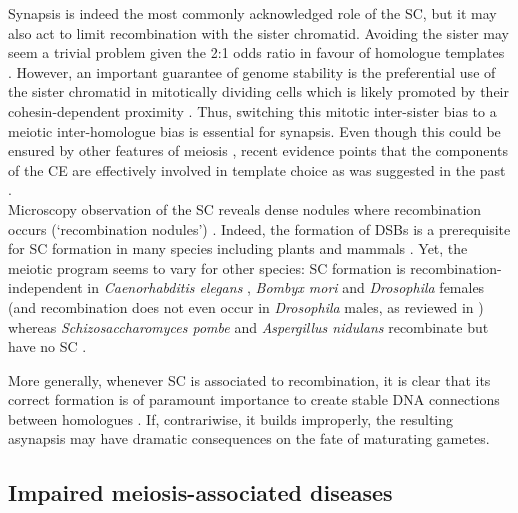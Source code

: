 Synapsis is indeed the most commonly acknowledged role of the SC, but it may also act to limit recombination with the sister chromatid.
Avoiding the sister may seem a trivial problem given the 2:1 odds ratio in favour of homologue templates \citep{lao2010trying}. 
However, an important guarantee of genome stability is the preferential use of the sister chromatid in mitotically dividing cells \citep{kadyk1992sister,bzymek2010double} which is likely promoted by their cohesin-dependent proximity \citep{sjogren2010sphase}.
Thus, switching this mitotic inter-sister bias to a meiotic inter-homologue bias is essential for synapsis.
Even though this could be ensured by other features of meiosis \citep[reviewed in \citealp{humphryes2014non}]{schwacha1997interhomolog, goldfarb2010frequent, hong2013logic}, recent evidence points that the components of the CE are effectively involved in template choice \citep{kim2010sister} as was suggested in the past \citep{haber1998meiosis}.\\

Microscopy observation of the SC reveals dense nodules where recombination occurs (‘recombination nodules’) \citep{carpenter1975electron, schmekel1998evidence}.
Indeed, the formation of DSBs is a prerequisite for SC formation in many species including plants and mammals \citep{zickler1999meiotic, henderson2004tying}.
Yet, the meiotic program seems to vary for other species: SC formation is recombination-independent in \textit{Caenorhabditis elegans} \citep{dernburg1998meiotic}, \textit{Bombyx mori} \citep{rasmussen1977transformation} and \textit{Drosophila} females \citep{mckim1998meiotic} (and recombination does not even occur in \textit{Drosophila} males, as reviewed in \citealp{tsai2011homologous}) whereas \textit{Schizosaccharomyces pombe} \citep{bahler1993unusual} and \textit{Aspergillus nidulans} \citep{egel1982meiosis} recombinate but have no SC \citep[reviewed in][]{zickler2015recombination}.

More generally, whenever SC is associated to recombination, it is clear that its correct formation is of paramount importance to create stable DNA connections between homologues \citep[reviewed in \citealp{hunter2003synaptonemal}]{hunter2001singleend}.
If, contrariwise, it builds improperly, the resulting asynapsis may have dramatic consequences on the fate of maturating gametes.







\subsection{Impaired meiosis-associated diseases}

